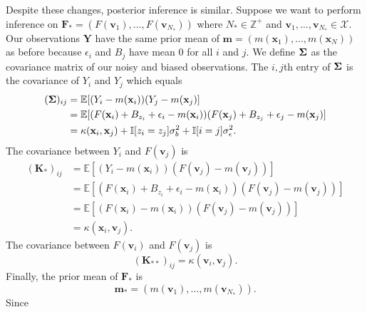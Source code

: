 Despite these changes, posterior inference is similar.
Suppose we want to perform inference on $\mathbf{F}_* = (F(\mathbf{v}_1), \dots, F(\mathbf{v}_{N_{*}}))$
where $N_{*} \in \mathbb{Z}^{+}$ and $\mathbf{v}_1, \ldots, \mathbf{v}_{N_*} \in \mathcal{X}$.
Our observations $\mathbf{Y}$ have the same prior mean of $\mathbf{m} = (m(\mathbf{x}_1), \dots, m(\mathbf{x}_N))$ as before because $\epsilon_i$ and $B_j$ have mean 0 for all $i$ and $j$.
We define $\boldsymbol{\Sigma}$ as the covariance matrix of our noisy and biased observations.
The $i, j$th entry of $\boldsymbol{\Sigma}$ is the covariance of $Y_i$ and $Y_{j}$ which equals
\begin{align*}
    (\boldsymbol{\Sigma})_{ij}
    & = \mathbb{E}[(Y_i - m(\mathbf{x}_i))(Y_j - m(\mathbf{x}_j)] \\
    & = \mathbb{E}[(F(\mathbf{x}_i) + B_{z_i} + \epsilon_i - m(\mathbf{x}_i))(F(\mathbf{x}_j) + B_{z_j} + \epsilon_j - m(\mathbf{x}_j)] \\
    & = \kappa(\mathbf{x}_i, \mathbf{x}_{j}) + \mathbb{I}[z_i = z_{j}] \sigma^2_b + \mathbb{I}[i = j]\sigma^2_{ \epsilon }.
\end{align*}
The covariance between $Y_i$ and $F(\mathbf{v}_j)$ is
\begin{align*}
    (\mathbf{K}_{*})_{ij}
    & = \mathbb{E}[ (Y_i - m(\mathbf{x}_i))(F(\mathbf{v}_j) - m(\mathbf{v}_j)) ] \\
    & = \mathbb{E}[ (F(\mathbf{x}_i) + B_{z_i} + \epsilon_i - m(\mathbf{x}_i))(F(\mathbf{v}_j) - m(\mathbf{v}_j))] \\
    & = \mathbb{E}[ (F(\mathbf{x}_i) - m(\mathbf{x}_i))(F(\mathbf{v}_j) - m(\mathbf{v}_j))] \\
    & = \kappa(\mathbf{x}_i, \mathbf{v}_j).
\end{align*}
The covariance between $F(\mathbf{v}_i)$ and $F(\mathbf{v}_j)$ is
\begin{equation*}
    (\mathbf{K}_{* *})_{ij} = \kappa(\mathbf{v}_i, \mathbf{v}_j).
\end{equation*}
Finally, the prior mean of $\mathbf{F}_*$ is
\begin{equation*}
    \mathbf{m}_* = (m(\mathbf{v}_1), \dots, m(\mathbf{v}_{N_*})).
\end{equation*}
Since
